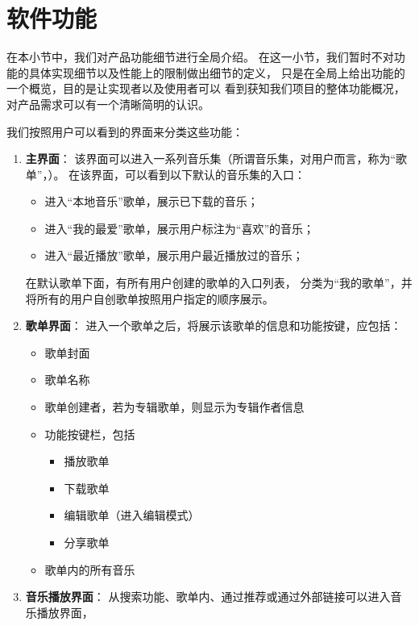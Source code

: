 \section{软件功能}

在本小节中，我们对\proname 产品功能细节进行全局介绍。
在这一小节，我们暂时不对功能的具体实现细节以及性能上的限制做出细节的定义，
    只是在全局上给出功能的一个概览，目的是让实现者以及使用者可以
    看到获知我们项目的整体功能概况，对产品需求可以有一个清晰简明的认识。

我们按照用户可以看到的界面来分类这些功能：
\begin{enumerate}
    \item \textbf{主界面}：
    该界面可以进入一系列音乐集（所谓音乐集，对用户而言，称为“歌单”，）。
        在该界面，可以看到以下默认的音乐集的入口：
        \begin{itemize}
            \item 进入``本地音乐''歌单，展示已下载的音乐；
            \item 进入``我的最爱''歌单，展示用户标注为``喜欢''的音乐；
            \item 进入``最近播放''歌单，展示用户最近播放过的音乐；
        \end{itemize}
        在默认歌单下面，有所有用户创建的歌单的入口列表，
        分类为``我的歌单''，并将所有的用户自创歌单按照用户指定的顺序展示。
    \item \textbf{歌单界面}：
    进入一个歌单之后，将展示该歌单的信息和功能按键，应包括：
        \begin{itemize}
            \item 歌单封面
            \item 歌单名称
            \item 歌单创建者，若为专辑歌单，则显示为专辑作者信息
            \item 功能按键栏，包括
            \begin{itemize}
                \item 播放歌单 
                \item 下载歌单 
                \item 编辑歌单（进入编辑模式） 
                \item 分享歌单 
            \end{itemize}
            \item 歌单内的所有音乐
        \end{itemize}
    \item \textbf{音乐播放界面}：
    从搜索功能、歌单内、通过推荐或通过外部链接可以进入音乐播放界面，

\end{enumerate}
